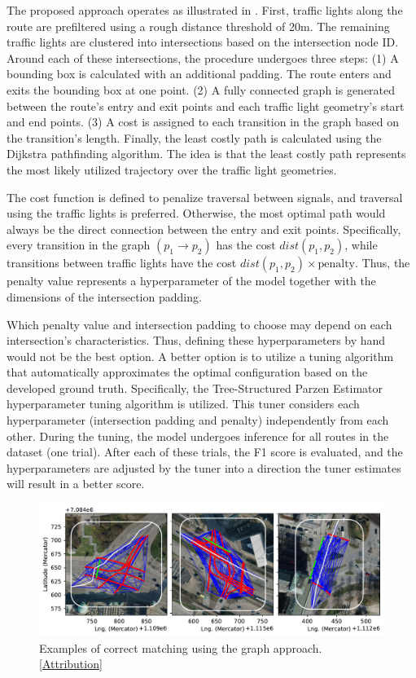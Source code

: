 The proposed approach operates as illustrated in . First, traffic lights along the route are prefiltered using a rough distance threshold of 20m. The remaining traffic lights are clustered into intersections based on the intersection node ID. Around each of these intersections, the procedure undergoes three steps: (1) A bounding box is calculated with an additional padding. The route enters and exits the bounding box at one point. (2) A fully connected graph is generated between the route's entry and exit points and each traffic light geometry's start and end points. (3) A cost is assigned to each transition in the graph based on the transition's length. Finally, the least costly path is calculated using the Dijkstra pathfinding algorithm. The idea is that the least costly path represents the most likely utilized trajectory over the traffic light geometries.

The cost function is defined to penalize traversal between signals, and traversal using the traffic lights is preferred. Otherwise, the most optimal path would always be the direct connection between the entry and exit points. Specifically, every transition in the graph  $(p_{1} \rightarrow p_{2})$ has the cost $dist(p_{1}, p_{2})$, while transitions between traffic lights have the cost $dist(p_{1}, p_{2}) \times \text{penalty}$. Thus, the penalty value represents a hyperparameter of the model together with the dimensions of the intersection padding. 

Which penalty value and intersection padding to choose may depend on each intersection's characteristics. Thus, defining these hyperparameters by hand would not be the best option. A better option is to utilize a tuning algorithm that automatically approximates the optimal configuration based on the developed ground truth. Specifically, the Tree-Structured Parzen Estimator hyperparameter tuning algorithm \cite{ozaki_multiobjective_2020} is utilized. This tuner considers each hyperparameter (intersection padding and penalty) independently from each other. During the tuning, the model undergoes inference for all routes in the dataset (one trial). After each of these trials, the F1 score is evaluated, and the hyperparameters are adjusted by the tuner into a direction the tuner estimates will result in a better score.

\begin{figure}[htbp]
\centering
\includegraphics[width=\linewidth]{images/matching-dijkstra-correct.pdf}
\caption{Examples of correct matching using the graph approach. [\hyperref[attribution]{Attribution}]}
\label{fig:sg-selection-graph-example}
\end{figure}

